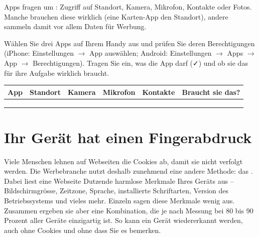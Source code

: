 Apps fragen um : Zugriff auf Standort, Kamera, Mikrofon, Kontakte oder Fotos.
Manche brauchen diese wirklich (eine Karten-App den Standort), andere sammeln damit vor allem Daten für Werbung.

\begin{myexercise}
	Wählen Sie drei Apps auf Ihrem Handy aus und prüfen Sie deren Berechtigungen
	(iPhone: Einstellungen $\rightarrow$ App auswählen; Android: Einstellungen $\rightarrow$ Apps $\rightarrow$ App $\rightarrow$ Berechtigungen).
	Tragen Sie ein, was die App darf (\faCheck) und ob sie das für ihre Aufgabe wirklich braucht.

	\begin{center}
		\renewcommand{\arraystretch}{1.6}
		\small
		\begin{tabular}{p{2.4cm}cccc p{3.2cm}}
			\textbf{App} & \textbf{Standort} & \textbf{Kamera} & \textbf{Mikrofon} & \textbf{Kontakte} & \textbf{Braucht sie das?} \\
			\midrule
			             &                   &                 &                   &                   &                           \\
			             &                   &                 &                   &                   &                           \\
			             &                   &                 &                   &                   &                           \\
		\end{tabular}
	\end{center}
\end{myexercise}

\section{Ihr Gerät hat einen Fingerabdruck}

Viele Menschen lehnen auf Webseiten die Cookies ab, damit sie nicht verfolgt werden.
Die Werbebranche nutzt deshalb zunehmend eine andere Methode: das .
Dabei liest eine Webseite Dutzende harmlose Merkmale Ihres Geräts aus -- Bildschirmgrösse, Zeitzone, Sprache, installierte Schriftarten, Version des Betriebssystems und vieles mehr.
Einzeln sagen diese Merkmale wenig aus. Zusammen ergeben sie aber eine Kombination, die je nach Messung bei 80 bis 90 Prozent aller Geräte einzigartig ist.
So kann ein Gerät wiedererkannt werden, auch ohne Cookies und ohne dass Sie es bemerken.

